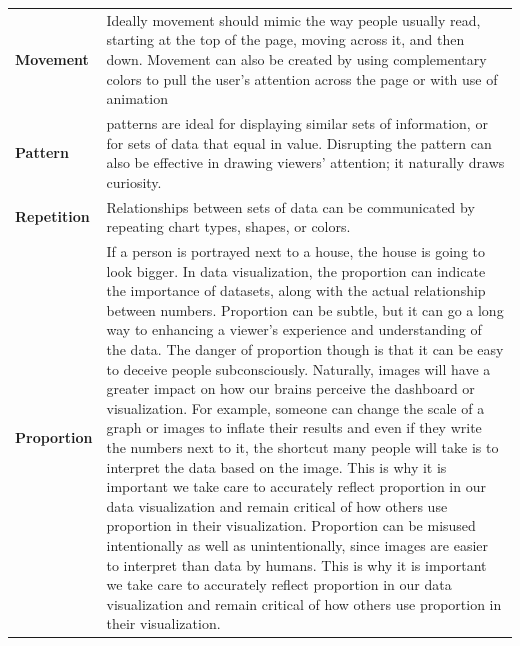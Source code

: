 \documentclass[]{book}
\begin{document}
\begin{longtable}[]{@{}ll@{}}
\begin{minipage}[t]{0.15\columnwidth}
\textbf{Movement}\strut
\end{minipage} & \begin{minipage}[t]{0.79\columnwidth}\raggedright
Ideally movement should mimic the way people usually read, starting at the top of the page, moving across it, and then down. Movement can also be created by using complementary colors to pull the user's attention across the page or with use of animation\strut
\end{minipage}\tabularnewline
\begin{minipage}[t]{0.15\columnwidth}\raggedright
\textbf{Pattern}\strut
\end{minipage} & \begin{minipage}[t]{0.79\columnwidth}\raggedright
patterns are ideal for displaying similar sets of information, or for sets of data that equal in value. Disrupting the pattern can also be effective in drawing viewers' attention; it naturally draws curiosity.\strut
\end{minipage}\tabularnewline
\begin{minipage}[t]{0.15\columnwidth}\raggedright
\textbf{Repetition}\strut
\end{minipage} & \begin{minipage}[t]{0.79\columnwidth}\raggedright
Relationships between sets of data can be communicated by repeating chart types, shapes, or colors.\strut
\end{minipage}\tabularnewline
\begin{minipage}[t]{0.15\columnwidth}\raggedright
\textbf{Proportion}\strut
\end{minipage} & \begin{minipage}[t]{0.79\columnwidth}\raggedright
If a person is portrayed next to a house, the house is going to look bigger. In data visualization, the proportion can indicate the importance of datasets, along with the actual relationship between numbers. Proportion can be subtle, but it can go a long way to enhancing a viewer's experience and understanding of the data. The danger of proportion though is that it can be easy to deceive people subconsciously. Naturally, images will have a greater impact on how our brains perceive the dashboard or visualization. For example, someone can change the scale of a graph or images to inflate their results and even if they write the numbers next to it, the shortcut many people will take is to interpret the data based on the image. This is why it is important we take care to accurately reflect proportion in our data visualization and remain critical of how others use proportion in their visualization. Proportion can be misused intentionally as well as unintentionally, since images are easier to interpret than data by humans. This is why it is important we take care to accurately reflect proportion in our data visualization and remain critical of how others use proportion in their visualization.\strut

\end{minipage}
\end{longtable}
\end{document}
